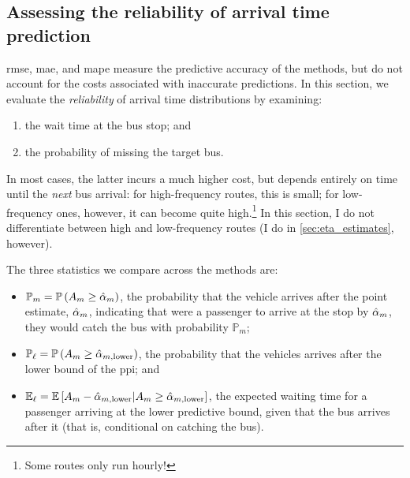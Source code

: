 \subsection{Assessing the reliability of arrival time prediction}
\label{sec:prediction_model_comp_probs}

\Gls{rmse}, \gls{mae}, and \gls{mape} measure the predictive accuracy of the methods, but do not account for the costs associated with inaccurate predictions. In this section, we evaluate the \emph{reliability} of arrival time distributions by examining:
\begin{enumerate}
\item the wait time at the bus stop; and
\item the probability of missing the target bus.
\end{enumerate}
In most cases, the latter incurs a much higher cost, but depends entirely on time until the \emph{next} bus arrival: for high-frequency routes, this is small; for low-frequency ones, however, it can become quite high.\footnote{Some routes only run hourly!} In this section, I do not differentiate between high and low-frequency routes (I do in \cref{sec:eta_estimates}, however).


The three statistics we compare across the methods are:
\begin{itemize}
\item $\mathbb{P}_m = \mathbb{P}\left(A_m \geq \hat{\alpha}_m\right)$, the probability that the vehicle arrives after the point estimate, $\hat{\alpha}_m$, indicating that were a passenger to arrive at the stop by $\hat{\alpha}_m$, they would catch the bus with probability $\mathbb{P}_m$;
\item $\mathbb{P}_\ell = \mathbb{P}\left(A_m \geq \hat\alpha_{m,\text{lower}}\right)$, the probability that the vehicles arrives after the lower bound of the \gls{ppi}; and
\item $\mathbb{E}_\ell = \mathbb{E}\left[A_m - \hat\alpha_{m,\text{lower}} | A_m \geq \hat\alpha_{m,\text{lower}}\right]$, the expected waiting time for a passenger arriving at the lower predictive bound, given that the bus arrives after it (that is, conditional on catching the bus).
\end{itemize}


